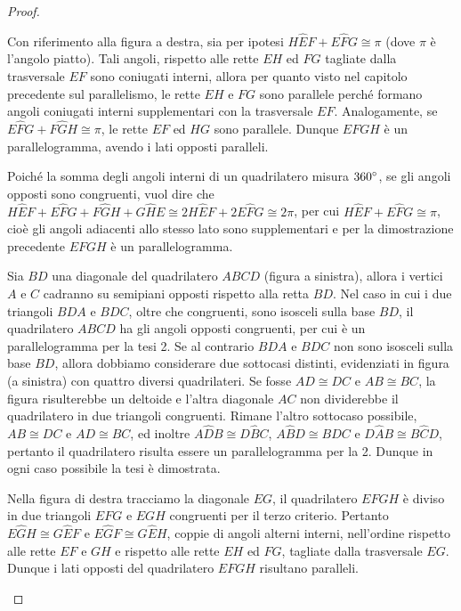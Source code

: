 \begin{proof}~\\
\begin{enumerate*}
\item Con riferimento alla figura a destra, sia per ipotesi $H\widehat{E}F+E\widehat{F}G\cong \pi$ (dove $\pi$ è l'angolo piatto). Tali angoli, rispetto alle rette $EH$ ed $FG$ tagliate dalla trasversale $EF$ sono coniugati interni, allora per quanto visto nel capitolo precedente sul parallelismo, le rette $EH$ e $FG$ sono parallele perché formano angoli coniugati interni supplementari con la trasversale $EF$. Analogamente, se $E\widehat{F}G+F\widehat{G}H\cong \pi$, le rette $EF$ ed $HG$ sono parallele. Dunque $EFGH$ è un parallelogramma, avendo i lati opposti paralleli.
\item Poiché la somma degli angoli interni di un quadrilatero misura $360{}^{\circ}$, se gli angoli opposti sono congruenti, vuol dire che $H\widehat{E}F+E\widehat{F}G+F\widehat{G}H+G\widehat{H}E\cong 2H\widehat{E}F+2E\widehat{F}G\cong 2\pi$, per cui $H\widehat{E}F+E\widehat{F}G\cong\pi$, cioè gli angoli adiacenti allo stesso lato sono supplementari e per la dimostrazione precedente $EFGH$ è un parallelogramma.
\item Sia $BD$ una diagonale del quadrilatero $ABCD$ (figura a sinistra), allora i vertici $A$ e $C$ cadranno su semipiani opposti rispetto alla retta $BD$. Nel caso in cui i due triangoli $BDA$ e $BDC$, oltre che congruenti, sono isosceli sulla base $BD$, il quadrilatero $ABCD$ ha gli angoli opposti congruenti, per cui è un parallelogramma per la tesi 2. Se al contrario $BDA$ e $BDC$ non sono isosceli sulla base $BD$, allora dobbiamo considerare due sottocasi distinti, evidenziati in figura (a sinistra) con quattro diversi quadrilateri. Se fosse $AD\cong DC$ e $AB\cong BC$, la figura risulterebbe un deltoide e l'altra diagonale $AC$ non dividerebbe il quadrilatero in due triangoli congruenti. Rimane l'altro sottocaso possibile, $AB\cong DC$ e $AD\cong BC$, ed inoltre $A\widehat{D}B\cong D\widehat{B}C$, $A\widehat{B}D\cong B\widehat{D}C$ e $D\widehat{A}B\cong B\widehat{C}D$, pertanto il quadrilatero risulta essere un parallelogramma per la 2. Dunque in ogni caso possibile la tesi è dimostrata.
\item Nella figura di destra tracciamo la diagonale $EG$, il quadrilatero $EFGH$ è diviso in due triangoli $EFG$ e $EGH$ congruenti per il terzo criterio. Pertanto $E\widehat{G}H\cong G\widehat{E}F$ e $E\widehat{G}F\cong G\widehat{E}H$, coppie di angoli alterni interni, nell'ordine rispetto alle rette $EF$ e $GH$ e rispetto alle rette $EH$ ed $FG$, tagliate dalla trasversale $EG$. Dunque i lati opposti del quadrilatero $EFGH$ risultano paralleli.

\end{enumerate*}
\end{proof}
